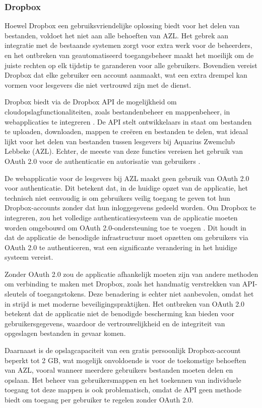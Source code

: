 \subsubsection{Dropbox}
Hoewel Dropbox een gebruiksvriendelijke oplossing biedt voor het delen van bestanden, voldoet het niet aan alle behoeften van AZL. 
Het gebrek aan integratie met de bestaande systemen zorgt voor extra werk voor de beheerders, en het ontbreken van geautomatiseerd 
toegangsbeheer maakt het moeilijk om de juiste rechten op elk tijdstip te garanderen voor alle gebruikers. Bovendien vereist Dropbox dat 
elke gebruiker een account aanmaakt, wat een extra drempel kan vormen voor lesgevers die niet vertrouwd zijn met de dienst.

Dropbox biedt via de Dropbox API de mogelijkheid om cloudopslagfunctionaliteiten, zoals bestandenbeheer en mappenbeheer, in webapplicaties te integreren \autocite{dropbox_api}. 
De API stelt ontwikkelaars in staat om bestanden te uploaden, downloaden, mappen te creëren en bestanden te delen, wat ideaal lijkt voor het delen van 
bestanden tussen lesgevers bij Aquarius Zwemclub Lebbeke (AZL). Echter, de meeste van deze functies vereisen het gebruik van OAuth 2.0 voor de authenticatie 
en autorisatie van gebruikers \autocite{dropbox_oauth}.

De webapplicatie voor de lesgevers bij AZL maakt geen gebruik van OAuth 2.0 voor authenticatie. Dit betekent dat, in de huidige opzet van de applicatie, 
het technisch niet eenvoudig is om gebruikers veilig toegang te geven tot hun Dropbox-accounts zonder dat hun inloggegevens gedeeld worden. Om Dropbox te 
integreren, zou het volledige authenticatiesysteem van de applicatie moeten worden omgebouwd om OAuth 2.0-ondersteuning toe te voegen \autocite{dropbox_oauth}. Dit houdt in dat de 
applicatie de benodigde infrastructuur moet opzetten om gebruikers via OAuth 2.0 te authenticeren, wat een significante verandering in het huidige systeem vereist.

Zonder OAuth 2.0 zou de applicatie afhankelijk moeten zijn van andere methoden om verbinding te maken met Dropbox, zoals het handmatig verstrekken van API-sleutels 
of toegangstokens. Deze benadering is echter niet aanbevolen, omdat het in strijd is met moderne beveiligingspraktijken. Het ontbreken van OAuth 2.0 betekent 
dat de applicatie niet de benodigde bescherming kan bieden voor gebruikersgegevens, waardoor de vertrouwelijkheid en de integriteit van opgeslagen bestanden 
in gevaar komen.

Daarnaast is de opslagcapaciteit van een gratis persoonlijk Dropbox-account beperkt tot 2 GB, wat mogelijk onvoldoende is voor de toekomstige behoeften van AZL, 
vooral wanneer meerdere gebruikers bestanden moeten delen en opslaan. Het beheer van gebruikersmappen en het toekennen van individuele toegang tot deze 
mappen is ook problematisch, omdat de API geen methode biedt om toegang per gebruiker te regelen zonder OAuth 2.0.

